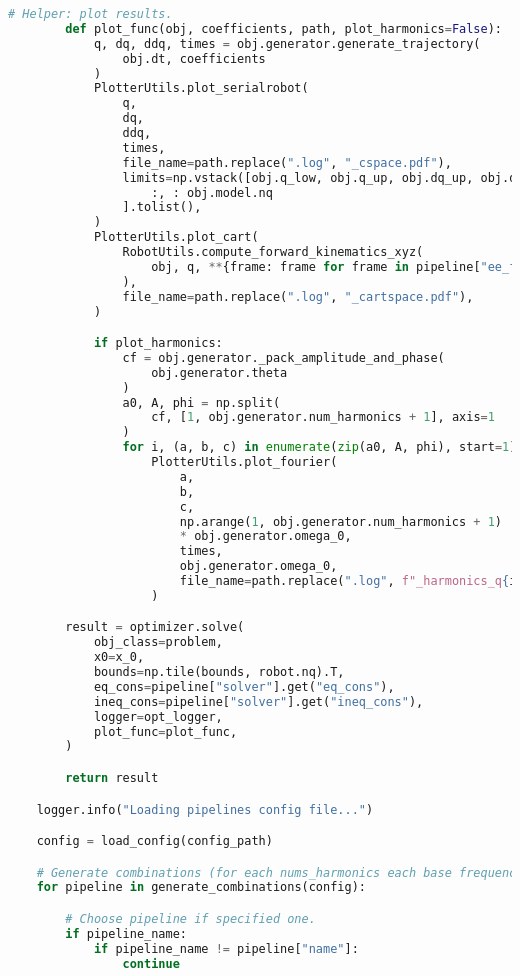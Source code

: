 \begin{lstlisting}[language=python, caption=\raggedright{generation/gen\_trajectory\_fourier.py}, frame=single]
        # Helper: plot results.
        def plot_func(obj, coefficients, path, plot_harmonics=False):
            q, dq, ddq, times = obj.generator.generate_trajectory(
                obj.dt, coefficients
            )
            PlotterUtils.plot_serialrobot(
                q,
                dq,
                ddq,
                times,
                file_name=path.replace(".log", "_cspace.pdf"),
                limits=np.vstack([obj.q_low, obj.q_up, obj.dq_up, obj.ddq_up])[
                    :, : obj.model.nq
                ].tolist(),
            )
            PlotterUtils.plot_cart(
                RobotUtils.compute_forward_kinematics_xyz(
                    obj, q, **{frame: frame for frame in pipeline["ee_frames"]}
                ),
                file_name=path.replace(".log", "_cartspace.pdf"),
            )

            if plot_harmonics:
                cf = obj.generator._pack_amplitude_and_phase(
                    obj.generator.theta
                )
                a0, A, phi = np.split(
                    cf, [1, obj.generator.num_harmonics + 1], axis=1
                )
                for i, (a, b, c) in enumerate(zip(a0, A, phi), start=1):
                    PlotterUtils.plot_fourier(
                        a,
                        b,
                        c,
                        np.arange(1, obj.generator.num_harmonics + 1)
                        * obj.generator.omega_0,
                        times,
                        obj.generator.omega_0,
                        file_name=path.replace(".log", f"_harmonics_q{i}.pdf"),
                    )

        result = optimizer.solve(
            obj_class=problem,
            x0=x_0,
            bounds=np.tile(bounds, robot.nq).T,
            eq_cons=pipeline["solver"].get("eq_cons"),
            ineq_cons=pipeline["solver"].get("ineq_cons"),
            logger=opt_logger,
            plot_func=plot_func,
        )

        return result

    logger.info("Loading pipelines config file...")

    config = load_config(config_path)

    # Generate combinations (for each nums_harmonics each base frequencies) and iterate through its.
    for pipeline in generate_combinations(config):

        # Choose pipeline if specified one.
        if pipeline_name:
            if pipeline_name != pipeline["name"]:
                continue


\end{lstlisting}
